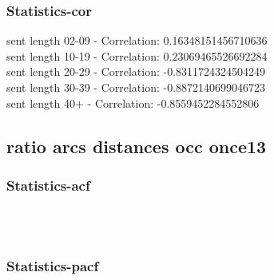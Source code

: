 \documentclass{article}%
\begin{document}
%
\newpage%
\subsubsection{Statistics{-}cor}%
\label{ssubsec:Statistics{-}cor}%
\noindent%
sent length 02-09 - Correlation: 0.16348151456710636\\%
sent length 10-19 - Correlation: 0.23069465526692284\\%
sent length 20-29 - Correlation: -0.8311724324504249\\%
sent length 30-39 - Correlation: -0.8872140699046723\\%
sent length 40+ - Correlation: -0.8559452284552806\\

%
\newpage

%
\subsection{ratio arcs distances occ once13}%
\label{subsec:ratioarcsdistancesocconce13}%
\subsubsection{Statistics{-}acf}%
\label{ssubsec:Statistics{-}acf}%


\begin{figure}[ht]%
\centering%
\setlength{\abovecaptionskip}{-35pt}%
%
%
\\%
%
%
\\%
%
\end{figure}

%
\newpage%
\subsubsection{Statistics{-}pacf}%
\label{ssubsec:Statistics{-}pacf}%
\end{document}
